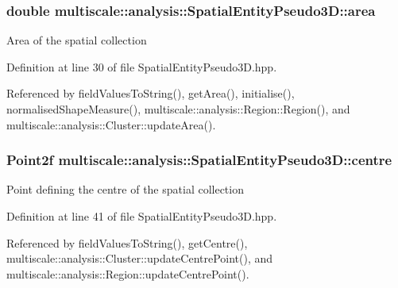 \hypertarget{classmultiscale_1_1analysis_1_1SpatialEntityPseudo3D_a1621d5b3ece663bf4c5501940e860292}{
\subsubsection[{area}]{\setlength{\rightskip}{0pt plus 5cm}double multiscale\-::analysis\-::\-Spatial\-Entity\-Pseudo3\-D\-::area\hspace{0.3cm}{\ttfamily [protected]}}}\label{classmultiscale_1_1analysis_1_1SpatialEntityPseudo3D_a1621d5b3ece663bf4c5501940e860292}
Area of the spatial collection 

Definition at line 30 of file Spatial\-Entity\-Pseudo3\-D.\-hpp.



Referenced by field\-Values\-To\-String(), get\-Area(), initialise(), normalised\-Shape\-Measure(), multiscale\-::analysis\-::\-Region\-::\-Region(), and multiscale\-::analysis\-::\-Cluster\-::update\-Area().

\hypertarget{classmultiscale_1_1analysis_1_1SpatialEntityPseudo3D_a647c25f9544d5537938bbadefc436634}{
\subsubsection[{centre}]{\setlength{\rightskip}{0pt plus 5cm}Point2f multiscale\-::analysis\-::\-Spatial\-Entity\-Pseudo3\-D\-::centre\hspace{0.3cm}{\ttfamily [protected]}}}\label{classmultiscale_1_1analysis_1_1SpatialEntityPseudo3D_a647c25f9544d5537938bbadefc436634}
Point defining the centre of the spatial collection 

Definition at line 41 of file Spatial\-Entity\-Pseudo3\-D.\-hpp.



Referenced by field\-Values\-To\-String(), get\-Centre(), multiscale\-::analysis\-::\-Cluster\-::update\-Centre\-Point(), and multiscale\-::analysis\-::\-Region\-::update\-Centre\-Point().

